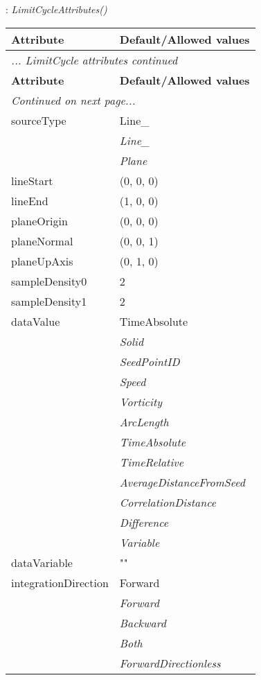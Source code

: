 \documentclass[10pt,a4paper]{report}
\begin{document}
\newpage

{}
: {\it LimitCycleAttributes() }\\[-3mm]

\begin{longtable}{ll}
{\bf Attribute} & {\bf Default/Allowed values} \\
\hline \hline
\endfirsthead
\multicolumn{2}{l}{{\it ... LimitCycle attributes continued}} \\
{\bf Attribute} & {\bf Default/Allowed values} \\
\hline \hline
\endhead
\hline
\multicolumn{2}{l}{{\it Continued on next page...}} \\
\endfoot
\hline
\endlastfoot

sourceType  &  Line\_   \\
 & {\it  Line\_} \\
 & {\it  Plane} \\
lineStart  &  (0, 0, 0) \\
lineEnd  &  (1, 0, 0) \\
planeOrigin  &  (0, 0, 0) \\
planeNormal  &  (0, 0, 1) \\
planeUpAxis  &  (0, 1, 0) \\
sampleDensity0  &  2 \\
sampleDensity1  &  2 \\
dataValue  &  TimeAbsolute   \\
 & {\it  Solid} \\
 & {\it  SeedPointID} \\
 & {\it  Speed} \\
 & {\it  Vorticity} \\
 & {\it  ArcLength} \\
 & {\it  TimeAbsolute} \\
 & {\it  TimeRelative} \\
 & {\it  AverageDistanceFromSeed} \\
 & {\it  CorrelationDistance} \\
 & {\it  Difference} \\
 & {\it  Variable} \\
dataVariable  &  "" \\
integrationDirection  &  Forward   \\
 & {\it  Forward} \\
 & {\it  Backward} \\
 & {\it  Both} \\
 & {\it  ForwardDirectionless} \\

\end{longtable}
\end{document}
